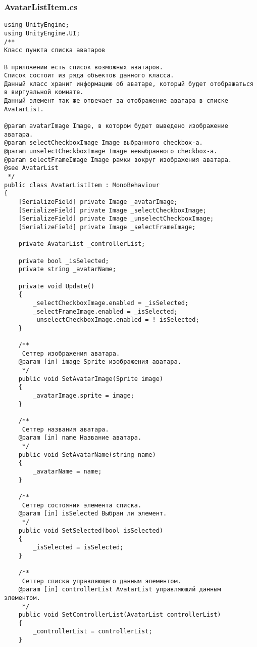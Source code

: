 \subsubsection*{AvatarListItem.cs}
\begin{verbatim}
﻿using UnityEngine;
using UnityEngine.UI;
/**
Класс пункта списка аватаров

В приложении есть список возможных аватаров. 
Список состоит из ряда объектов данного класса. 
Данный класс хранит информацию об аватаре, который будет отображаться в виртуальной комнате.
Данный элемент так же отвечает за отображение аватара в списке AvatarList.

@param avatarImage Image, в котором будет выведено изображение аватара.
@param selectCheckboxImage Image выбранного checkbox-а.
@param unselectCheckboxImage Image невыбранного checkbox-а.
@param selectFrameImage Image рамки вокруг изображения аватара.
@see AvatarList
 */
public class AvatarListItem : MonoBehaviour
{
    [SerializeField] private Image _avatarImage;
    [SerializeField] private Image _selectCheckboxImage;
    [SerializeField] private Image _unselectCheckboxImage;
    [SerializeField] private Image _selectFrameImage;

    private AvatarList _controllerList;

    private bool _isSelected;
    private string _avatarName;

    private void Update()
    {
        _selectCheckboxImage.enabled = _isSelected;
        _selectFrameImage.enabled = _isSelected;
        _unselectCheckboxImage.enabled = !_isSelected;
    }

    /**
     Сеттер изображения аватара.
    @param [in] image Sprite изображения аватара.
     */
    public void SetAvatarImage(Sprite image)
    {
        _avatarImage.sprite = image;
    }

    /**
     Сеттер названия аватара.
    @param [in] name Название аватара.
     */
    public void SetAvatarName(string name)
    {
        _avatarName = name;
    }

    /**
     Сеттер состояния элемента списка.
    @param [in] isSelected Выбран ли элемент.
     */
    public void SetSelected(bool isSelected)
    {
        _isSelected = isSelected;
    }

    /**
     Сеттер списка управляющего данным элементом.
    @param [in] controllerList AvatarList управляющий данным элементом.
     */
    public void SetControllerList(AvatarList controllerList)
    {
        _controllerList = controllerList;
    }


\end{verbatim}
